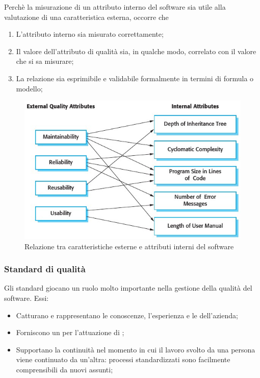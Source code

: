 Perchè la misurazione di un attributo interno del software sia utile alla
valutazione di una caratteristica esterna, occorre che

\begin{enumerate}
  \item L'attributo interno sia misurato correttamente;
  \item Il valore dell'attributo di qualità sia, in qualche modo, correlato con
    il valore che si sa misurare;
  \item La relazione sia esprimibile e validabile formalmente in termini di
    formula o modello;
\end{enumerate}

\begin{figure}[h]
  \centering
  \includegraphics[scale=0.6]{imgs/int_ext_attrib.jpg}
  \caption{Relazione tra caratteristiche esterne e attributi interni del
    software}
\end{figure}

\subsubsection{Standard di qualità}

Gli standard giocano un ruolo molto importante nella gestione della qualità del
software. Essi:

\begin{itemize}
  \item Catturano e rappresentano le conoscenze, l'esperienza e le
     dell'azienda;
  \item Forniscono un  per l'attuazione di ;
  \item Supportano la continuità nel momento in cui il lavoro svolto da una
    persona viene continuato da un'altra: processi standardizzati sono
    facilmente comprensibili da nuovi assunti;
\end{itemize}

